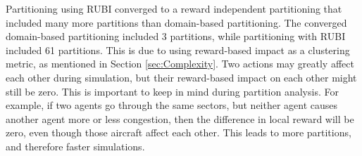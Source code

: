 \documentclass[smallcondensed]{svjour3}
\begin{document}



Partitioning using RUBI converged to a reward independent partitioning that included many more partitions than domain-based partitioning. The converged domain-based partitioning included 3 partitions, while partitioning with RUBI included 61 partitions. This is due to using reward-based impact as a clustering metric, as mentioned in Section \ref{sec:Complexity}. Two actions may greatly affect each other during simulation, but their reward-based impact on each other might still be zero. This is important to keep in mind during partition analysis. For example, if two agents go through the same sectors, but neither agent causes another agent more or less congestion, then the difference in local reward will be zero, even though those aircraft affect each other. This leads to more partitions, and therefore faster simulations.
\end{document}
